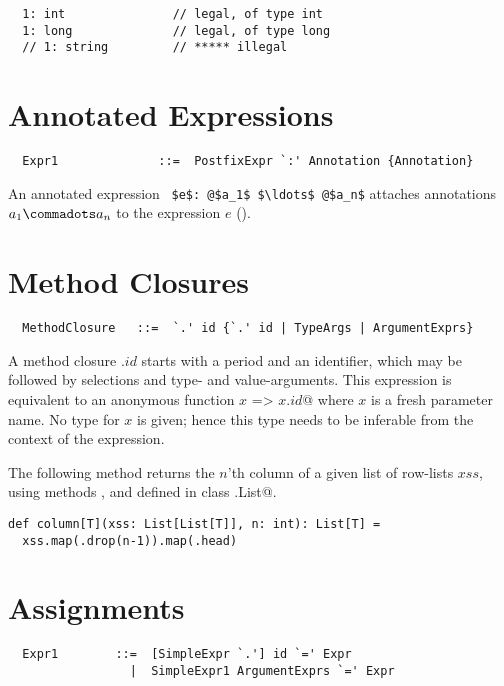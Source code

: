 \begin{lstlisting}
  1: int               // legal, of type int
  1: long              // legal, of type long
  // 1: string         // ***** illegal
\end{lstlisting}



\section{Annotated Expressions}

\syntax\begin{lstlisting}
  Expr1              ::=  PostfixExpr `:' Annotation {Annotation} 
\end{lstlisting}

An annotated expression ~\lstinline^$e$: @$a_1$ $\ldots$ @$a_n$^
attaches annotations $a_1 \commadots a_n$ to the expression $e$
().

\section{Method Closures}
\syntax\begin{lstlisting}
  MethodClosure   ::=  `.' id {`.' id | TypeArgs | ArgumentExprs}
\end{lstlisting}

A method closure $.id$ starts with a period and an identifier, which
may be followed by selections and type- and value-arguments. This
expression is equivalent to an anonymous function
\lstinline@$x$ => $x.id$@ where $x$ is a fresh parameter name. No type
for $x$ is given; hence this type needs to be inferable from the
context of the expression.

\example The following method returns the $n$'th column of a given
list of row-lists $xss$, using methods \lstinline@map@,
\lstinline@drop@ and \lstinline@head@ defined in class
\lstinline@scala.List@.
\begin{lstlisting}
def column[T](xss: List[List[T]], n: int): List[T] = 
  xss.map(.drop(n-1)).map(.head)
\end{lstlisting}
 
\section{Assignments}\label{sec:assigments}

\syntax\begin{lstlisting}
  Expr1        ::=  [SimpleExpr `.'] id `=' Expr
                 |  SimpleExpr1 ArgumentExprs `=' Expr
\end{lstlisting}

